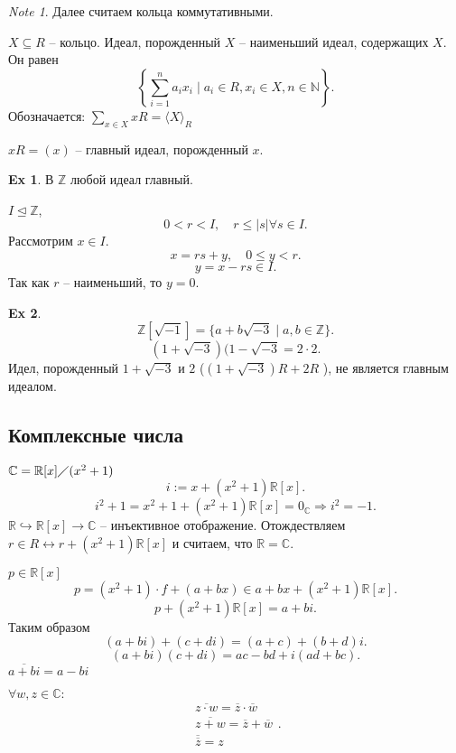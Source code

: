 \documentclass[11pt]{book}
\newcommand{\Z}{\mathbb{Z}}
\newcommand{\N}{\mathbb{N}}
\newcommand{\R}{\mathbb{R}}
\newcommand{\Cm}{\mathbb{C}}
\newcommand{\slim}{\sum\limits}
\theoremstyle{definition}
\theoremstyle{plain}
\theoremstyle{plain}
\theoremstyle{definition}
\newtheorem*{ex}{Ex}
\theoremstyle{remark}
\newtheorem*{note}{Note}
\begin{document}
 \begin{note}
    Далее считаем кольца коммутативными.
\end{note}
\begin{defn}
$X \subseteq R$  -- кольцо.
Идеал, порожденный $X$  -- наименьший идеал, содержащих $X$. Он равен \[
    \left\{\slim_{i=1}^{n}a_ix_i \mid a_i \in  R, x_i \in  X, n \in \N\right\}
.\] 
Обозначается: $\slim_{x \in  X} x R = \langle X \rangle_R$

$xR = (x)$ -- главный идеал, порожденный $x$.
\end{defn}
\begin{ex}
    В $\Z$ любой идеал главный.

    $I \trianglelefteq \Z$,  \[
    0 < r< I, \quad r \le |s| \forall s \in I
    .\] 
    Рассмотрим  $x \in  I$.
    \[
    x = rs + y, \quad 0 \le y < r
    .\] 
    \[
    y = x - rs \in  I
    .\] 
    Так как $r$  -- наименьший, то $y=0$.
\end{ex}
\begin{ex}
    \[
	\Z [ \sqrt{-1}] = \{a + b\sqrt{-3} \mid a, b \in  \Z\}
    .\] 
    \[
	(1 + \sqrt{-3} )(1 - \sqrt{-3} = 2 \cdot 2
    .\] 
    Идел, порожденный $1+\sqrt{-3}$ и $2$ ($(1 + \sqrt{-3}) R + 2 R $ ), не является главным идеалом. 
\end{ex}
\subsection{Комплексные числа}
    $\Cm = \R[x]\diagup (x^2+1)$
    \[
	i := x + (x^2+1) \R[x]
    .\] 
    \[
	i^2+1 = x^2 + 1 + (x^2+1)\R[x] = 0_\Cm \Longrightarrow i^2 = -1
    .\] 
    $\R \hookrightarrow \R[x] \to \Cm$ -- инъективное отображение.   
    Отождествляем $r \in  R \longleftrightarrow r + (x^2+1) \R[x]$ и считаем, что $\R = \Cm$.

   $p \in  \R[x]$
   \[
       p = (x^2 + 1) \cdot f + (a + b x) \in  a + bx + (x^2 + 1)\R[x]
   .\] 
   \[
       p + (x^2+1) \R[x] = a + bi
   .\] 
   Таким образом \[
       (a + bi) + (c + di) = (a+c)+ (b+d)i
   .\] 
   \[
       (a + bi)(c + di) = ac - bd + i (ad+bc)
   .\] 
  $\overline{a+ bi} = a-bi $

   $ \forall  w, z \in  \Cm:$
   \[
       \begin{array}{c}
	   \overline{z\cdot w} = \overline{z} \cdot \overline{w}\\
	   \overline{z + w} = \overline{z} + \overline{w}\\
	   \overline{\overline{z}} = z
       \end{array}
   .\] 
\end{document}
